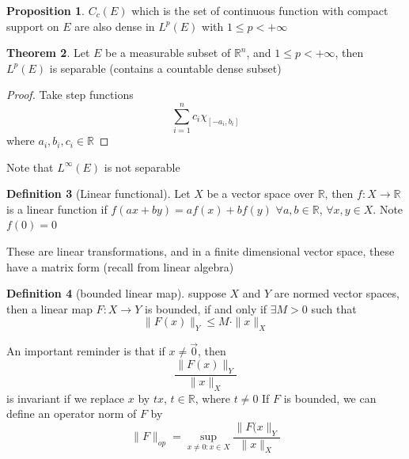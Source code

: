 \documentclass[13pt]{article}
\theoremstyle{definition} --- default
\newtheorem{theorem}{Theorem}
\newtheorem{proposition}[theorem]{Proposition}
\theoremstyle{definition}
\newtheorem{definition}[theorem]{Definition}
\theoremstyle{remark}
\begin{document}
	\begin{proposition}
		$C_c(E)$ which is the set of continuous function with compact support on $E$ are also dense in $L^p(E)$ with $1 \leq p < +\infty$
	\end{proposition}
	\begin{theorem}
		Let $E$ be a measurable subset of $\mathbb{R}^n$, and $1 \leq p < +\infty$, then $L^p(E)$ is separable (contains a countable dense subset)

	\end{theorem}
	\begin{proof}
		Take step functions 
		\[
			\sum_{i=1}^n c_i \chi_{[-a_i,b_i]}
		\]
		where $a_i,b_i,c_i \in \mathbb{R}$
	\end{proof}
	Note that $L^\infty(E)$ is not separable

	\begin{definition}[Linear functional]
		Let $X$ be a vector space over $\mathbb{R}$, then $f \colon X \to \mathbb{R}$ is a linear function if $f(ax+by) = af(x) + bf(y)$ $\forall a,b \in \mathbb{R}$, $\forall x,y \in X$. Note $f(0) = 0$
	\end{definition}
	These are linear transformations, and in a finite dimensional vector space, these have a matrix form (recall from linear algebra)

	\begin{definition}[bounded linear map]
		suppose $X$ and $Y$ are normed vector spaces, then a linear map $F \colon X \to Y$ is bounded, if and only if $\exists M >0$ such that 
		$$\|F(x)\|_Y\leq M\cdot \|x\|_X$$ 



	\end{definition}
	An important reminder is that if $x \neq \vec{0}$, then 
	$$
	\frac{\|F(x)\|_Y}{\|x\|_X}
	$$
	is invariant if we replace $x$ by $t x$, $t \in \mathbb{R}$, where $t \neq 0$
	If $F$ is bounded, we can define an operator norm of $F$ by 
	$$\|F\|_{op} = \sup_{x \neq 0 \colon x \in X} \frac{\|F(x\|_Y}{\|x\|_X}$$
\end{document}
